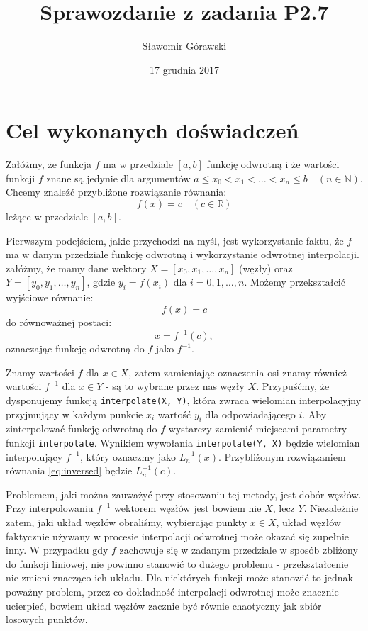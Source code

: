 \documentclass{article}
\title{Sprawozdanie z zadania P2.7}
\author{Sławomir Górawski}
\date{17 grudnia 2017}
\begin{document}
\maketitle

\section{Cel wykonanych doświadczeń}

Załóżmy, że funkcja $f$ ma w przedziale $[a,b]$ funkcję odwrotną i że wartości funkcji $f$ znane są jedynie dla argumentów $a \leq x_0 < x_1 < \ldots < x_n \leq b \quad (n \in \mathbb{N})$. Chcemy znaleźć przybliżone rozwiązanie równania:
\begin{equation}\label{eq:initial}
    f(x)=c \quad (c \in \mathbb{R})
\end{equation}
leżące w przedziale $[a,b]$.

Pierwszym podejściem, jakie przychodzi na myśl, jest wykorzystanie faktu, że $f$ ma w danym przedziale funkcję odwrotną i wykorzystanie odwrotnej interpolacji. załóżmy, że mamy dane wektory $X=[x_0,x_1,\ldots,x_n]$ (węzły) oraz $Y=[y_0, y_1,\ldots,y_n]$, gdzie $y_i=f(x_i)$ dla $i=0,1,\ldots,n$. Możemy przekształcić wyjściowe równanie:
\begin{equation*}
    f(x)=c
\end{equation*}
do równoważnej postaci:
\begin{equation}\label{eq:inversed}
    x=f^{-1}(c),
\end{equation}
oznaczając funkcję odwrotną do $f$ jako $f^{-1}$.

Znamy wartości $f$ dla $x\in X$, zatem zamieniając oznaczenia osi znamy również wartości $f^{-1}$ dla $x\in Y$ - są to wybrane przez nas węzły $X$. Przypuśćmy, że dysponujemy funkcją \texttt{interpolate(X, Y)}, która zwraca wielomian interpolacyjny przyjmujący w każdym punkcie $x_i$ wartość $y_i$ dla odpowiadającego $i$. Aby zinterpolować funkcję odwrotną do $f$ wystarczy zamienić miejscami parametry funkcji \texttt{interpolate}. Wynikiem wywołania \texttt{interpolate(Y, X)} będzie wielomian interpolujący $f^{-1}$, który oznaczmy jako $L_n^{-1}(x)$. Przybliżonym rozwiązaniem równania \eqref{eq:inversed} będzie $L_n^{-1}(c)$.

Problemem, jaki można zauważyć przy stosowaniu tej metody, jest dobór węzłów. Przy interpolowaniu $f^{-1}$ wektorem węzłów jest bowiem nie $X$, lecz $Y$. Niezależnie zatem, jaki układ węzłów obraliśmy, wybierając punkty $x\in X$, układ węzłów faktycznie używany w procesie interpolacji odwrotnej może okazać się zupełnie inny. W przypadku gdy $f$ zachowuje się w zadanym przedziale w sposób zbliżony do funkcji liniowej, nie powinno stanowić to dużego problemu - przekształcenie nie zmieni znacząco ich układu. Dla niektórych funkcji może stanowić to jednak poważny problem, przez co dokładność interpolacji odwrotnej może znacznie ucierpieć, bowiem układ węzłów zacznie być równie chaotyczny jak zbiór losowych punktów.
\end{document}
